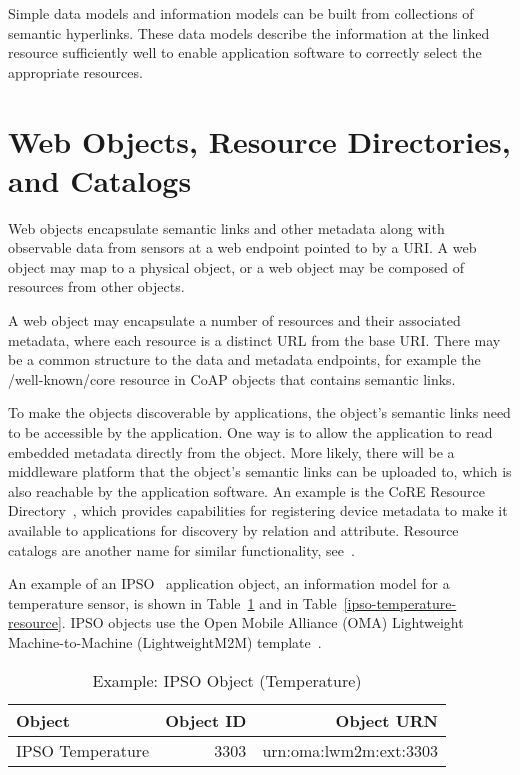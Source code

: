 \documentclass[journal]{IEEEtran}
\begin{document}
Simple data models and information models can be built from collections of semantic hyperlinks. These data models describe the information at the linked resource sufficiently well to enable application software to correctly select the appropriate resources. 

\section{Web Objects, Resource Directories, and Catalogs}
Web objects encapsulate semantic links and other metadata along with observable data from sensors at a web endpoint pointed to by a URI. A web object may map to a physical object, or a web object may be composed of resources from other objects.

A web object may encapsulate a number of resources and their associated metadata, where each resource is a distinct URL from the base URI. There may be a common structure to the data and metadata endpoints, for example the /well-known/core resource in CoAP objects that contains semantic links.

To make the objects discoverable by applications, the object's semantic links need to be accessible by the application. One way is to allow the application to read embedded metadata directly from the object. More likely, there will be a middleware platform that the object's semantic links can be uploaded to, which is also reachable by the application software. An example is the CoRE Resource Directory~\cite{draft-ietf-core-resource-directory}, which provides capabilities for registering device metadata to make it available to applications for discovery by relation and attribute. Resource catalogs are another name for similar functionality, see~\cite{HyperCat}.

An example of an IPSO~\cite{IPSO} application object, an information model for a temperature sensor, is shown in Table~\ref{ipso-temperature} and in Table~\ref{ipso-temperature-resource}. IPSO objects use the Open Mobile Alliance (OMA) Lightweight Machine-to-Machine (LightweightM2M) template~\cite{LWM2M}.

\begin{table}[htdp]
\caption{Example: IPSO Object (Temperature)}
\begin{center}
\begin{tabular}{|l|r|r|}
\hline
\textbf{Object} & \textbf{Object ID} & \textbf{Object URN}\\
\hline\hline
IPSO Temperature & 3303 & urn:oma:lwm2m:ext:3303 \\ 
\hline
\end{tabular}
\end{center}
\label{ipso-temperature}
\end{table}
\end{document}

